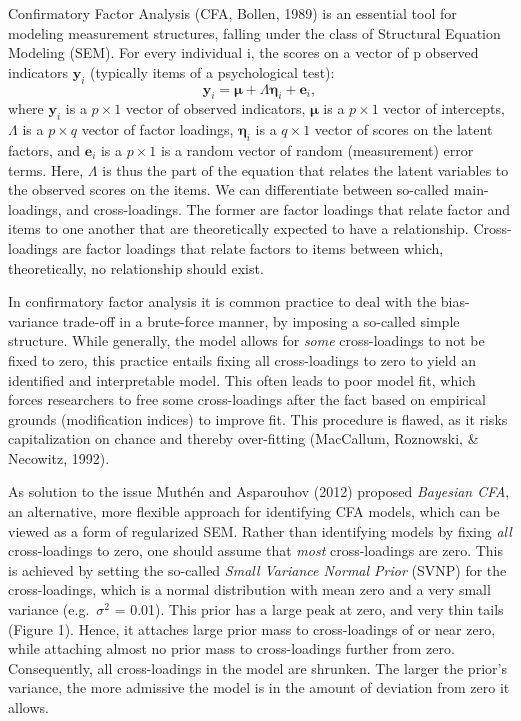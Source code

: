 \documentclass[
  man, donotrepeattitle,floatsintext]{apa6}
\begin{document}
Confirmatory Factor Analysis (CFA, Bollen, 1989) is an essential tool for modeling measurement structures, falling under the class of Structural Equation Modeling (SEM). For every individual i, the scores on a vector of p observed indicators \(\mathbf{y}_i\) (typically items of a psychological test):
\[\boldsymbol{y}_i = \boldsymbol{\mu} + \Lambda \boldsymbol{\eta}_i + \boldsymbol{e}_i ,\]
where \(\boldsymbol{y}_i\) is a \(p \times 1\) vector of observed indicators, \(\boldsymbol{\mu}\) is a \(p \times 1\) vector of intercepts, \(\Lambda\) is a \(p \times q\) vector of factor loadings, \(\boldsymbol{\eta}_i\) is a \(q \times 1\) vector of scores on the latent factors, and \(\boldsymbol{e}_i\) is a \(p \times 1\) is a random vector of random (measurement) error terms. Here, \(\Lambda\) is thus the part of the equation that relates the latent variables to the observed scores on the items. We can differentiate between so-called main-loadings, and cross-loadings. The former are factor loadings that relate factor and items to one another that are theoretically expected to have a relationship. Cross-loadings are factor loadings that relate factors to items between which, theoretically, no relationship should exist.

In confirmatory factor analysis it is common practice to deal with the bias-variance trade-off in a brute-force manner, by imposing a so-called simple structure. While generally, the model allows for \emph{some} cross-loadings to not be fixed to zero, this practice entails fixing all cross-loadings to zero to yield an identified and interpretable model. This often leads to poor model fit, which forces researchers to free some cross-loadings after the fact based on empirical grounds (modification indices) to improve fit. This procedure is flawed, as it risks capitalization on chance and thereby over-fitting (MacCallum, Roznowski, \& Necowitz, 1992).

As solution to the issue Muthén and Asparouhov (2012) proposed \emph{Bayesian CFA}, an alternative, more flexible approach for identifying CFA models, which can be viewed as a form of regularized SEM. Rather than identifying models by fixing \emph{all} cross-loadings to zero, one should assume that \emph{most} cross-loadings are zero. This is achieved by setting the so-called \emph{Small Variance Normal Prior} (SVNP) for the cross-loadings, which is a normal distribution with mean zero and a very small variance (e.g.~\(\sigma^2\) = 0.01). This prior has a large peak at zero, and very thin tails (Figure 1). Hence, it attaches large prior mass to cross-loadings of or near zero, while attaching almost no prior mass to cross-loadings further from zero. Consequently, all cross-loadings in the model are shrunken. The larger the prior's variance, the more admissive the model is in the amount of deviation from zero it allows.
\end{document}
